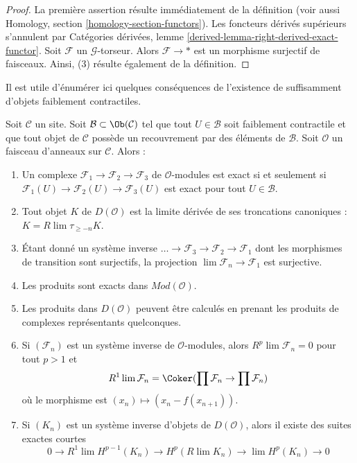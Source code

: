 \begin{proof}
La première assertion résulte immédiatement de la définition (voir aussi
Homology, section \ref{homology-section-functors}). Les foncteurs dérivés
supérieurs s'annulent par Catégories dérivées, lemme
\ref{derived-lemma-right-derived-exact-functor}. Soit $\mathcal{F}$ un
$\mathcal{G}$-torseur. Alors $\mathcal{F} \to *$ est un morphisme surjectif de
faisceaux. Ainsi, (3) résulte également de la définition.
\end{proof}

\noindent
Il est utile d'énumérer ici quelques conséquences de l'existence de
suffisamment d'objets faiblement contractiles.

\begin{proposition}
\label{proposition-enough-weakly-contractibles}
Soit $\mathcal{C}$ un site. Soit $\mathcal{B} \subset \Ob(\mathcal{C})$ tel
que tout $U \in \mathcal{B}$ soit faiblement contractile et que tout objet de
$\mathcal{C}$ possède un recouvrement par des éléments de $\mathcal{B}$. Soit
$\mathcal{O}$ un faisceau d'anneaux sur $\mathcal{C}$. Alors :
\begin{enumerate}
\item Un complexe $\mathcal{F}_1 \to \mathcal{F}_2 \to \mathcal{F}_3$ de
$\mathcal{O}$-modules est exact si et seulement si
$\mathcal{F}_1(U) \to \mathcal{F}_2(U) \to \mathcal{F}_3(U)$
est exact pour tout $U \in \mathcal{B}$.
\item Tout objet $K$ de $D(\mathcal{O})$ est la limite dérivée de ses
troncations canoniques : $K = R\lim \tau_{\geq -n} K$.
\item Étant donné un système inverse
$\ldots \to \mathcal{F}_3 \to \mathcal{F}_2 \to \mathcal{F}_1$
dont les morphismes de transition sont surjectifs, la projection
$\lim \mathcal{F}_n \to \mathcal{F}_1$ est surjective.
\item Les produits sont exacts dans $\textit{Mod}(\mathcal{O})$.
\item Les produits dans $D(\mathcal{O})$ peuvent être calculés en prenant les
produits de complexes représentants quelconques.
\item Si $(\mathcal{F}_n)$ est un système inverse de $\mathcal{O}$-modules,
alors $R^p\lim \mathcal{F}_n = 0$ pour tout $p > 1$ et
$$
R^1\lim \mathcal{F}_n  =
\Coker(\prod \mathcal{F}_n \to \prod \mathcal{F}_n)
$$
où le morphisme est $(x_n) \mapsto (x_n - f(x_{n + 1}))$.
\item Si $(K_n)$ est un système inverse d'objets de $D(\mathcal{O})$, alors il
existe des suites exactes courtes
$$
0 \to R^1\lim H^{p - 1}(K_n) \to H^p(R\lim K_n) \to
\lim H^p(K_n) \to 0
$$
\end{enumerate}
\end{proposition}

